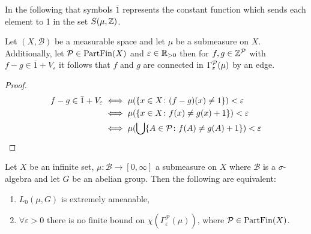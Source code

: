 In the following that symbols $\bar{1}$ represents the constant function which sends each element to 1 in the set $S(\mu, \Z)$. 

\begin{lemma}\label{lem:1}
  Let $(X, \mathcal{B})$ be a measurable space and let $\mu$ be a submeasure on $X$. Additionally, let $\P \in {\rm PartFin}(X)$ and $\varepsilon \in \R_{>0}$ then for $f,g \in \Z^\P$ with $f - g \in \bar{1} + V_\varepsilon$ it follows that $f$ and $g$ are connected in $\Gamma_\varepsilon^\P(\mu)$ by an edge.
\end{lemma}

\begin{proof}
  \begin{align*}
    f - g \in \bar{1} + V_\varepsilon   &\iff \mu(\{x \in X\colon (f-g)(x) \neq 1\}) < \varepsilon \\
                                      &\iff \mu(\{x \in X\colon f(x) \neq g(x) + 1\}) < \varepsilon \\
                                      &\iff \mu(\bigcup \{A \in \P \colon f(A) \neq g(A) + 1\}) < \varepsilon
  \end{align*}
\end{proof}

\begin{lemma}
  Let $X$ be an infinite set, $\mu\colon \mathcal{B} \to [0, \infty]$ a submeasure on $X$ where $\mathcal{B}$ is a $\sigma$-algebra and let $G$ be an abelian group. Then the following are equivalent:
  \begin{enumerate}
    \item $L_0(\mu, G)$ is extremely ameanable,
    \item $\forall \varepsilon > 0$ there is no finite bound on $\chi(\Gamma_{\varepsilon}^{\mathcal{P}}(\mu))$, where $\mathcal{P} \in {\rm PartFin}(X)$.
  \end{enumerate}
\end{lemma}

